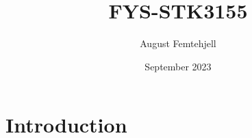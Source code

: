 \documentclass{article}
\title{FYS-STK3155}
\author{August Femtehjell}
\date{September 2023}
\begin{document}
\maketitle

\section{Introduction}
\end{document}
